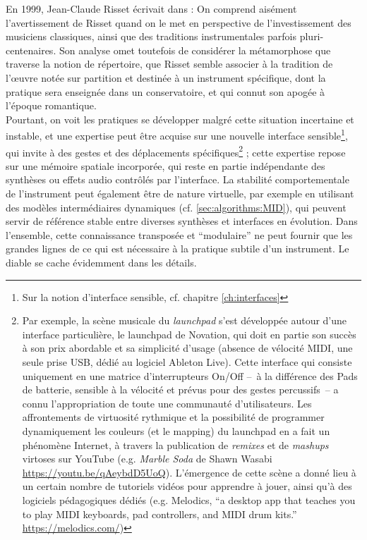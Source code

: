 \indent En 1999, Jean-Claude Risset écrivait dans \cite{genevois_les_1999} :  On comprend aisément l'avertissement de Risset quand on le met en perspective de l'investissement des musiciens classiques, ainsi que des traditions instrumentales parfois pluri-centenaires. Son analyse omet toutefois de considérer la métamorphose que traverse la notion de répertoire, que Risset semble associer à la tradition de l'œuvre notée sur partition et destinée à un instrument spécifique, dont la pratique sera enseignée dans un conservatoire, et qui connut son apogée à l'époque romantique.\\
\noindent Pourtant, on voit les pratiques se développer malgré cette situation incertaine et instable, et une expertise peut être acquise sur une nouvelle interface sensible\footnote{Sur la notion d'interface sensible, cf. chapitre \ref{ch:interfaces}}, qui invite à des gestes et des déplacements spécifiques\footnote{Par exemple, la scène musicale du \textit{launchpad} s'est développée autour d'une interface particulière, le launchpad de Novation, qui doit en partie son succès à son prix abordable et sa simplicité d'usage (absence de vélocité \gls{MIDI}, une seule prise \gls{USB}, dédié au logiciel Ableton Live). Cette interface qui consiste uniquement en une matrice d'interrupteurs On/Off --~à la différence des Pads de batterie, sensible à la vélocité et prévus pour des gestes percussifs~-- a connu l'appropriation de toute une communauté d'utilisateurs. Les affrontements de virtuosité rythmique et la possibilité de programmer dynamiquement les couleurs (et le mapping) du launchpad en a fait un phénomène Internet, à travers la publication de \textit{remixes} et de \textit{mashups} virtoses sur YouTube (e.g. \textit{Marble Soda} de Shawn Wasabi \url{https://youtu.be/qAeybdD5UoQ}). L'émergence de cette scène a donné lieu à un certain nombre de tutoriels vidéos pour apprendre à jouer, ainsi qu'à des logiciels pédagogiques dédiés (e.g. Melodics, ``a desktop app that teaches you to play MIDI keyboards, pad controllers, and MIDI drum kits.'' \url{https://melodics.com/})} ; cette expertise repose sur une mémoire spatiale incorporée, qui reste en partie indépendante des synthèses ou effets audio contrôlés par l'interface. La stabilité comportementale de l'instrument peut également être de nature virtuelle, par exemple en utilisant des modèles intermédiaires dynamiques \cite{goudard_dynamic_2011} (cf. \ref{sec:algorithms:MID}), qui peuvent servir de référence stable entre diverses synthèses et interfaces en évolution.
\noindent Dans l'ensemble, cette connaissance transposée et ``modulaire'' ne peut fournir que les grandes lignes de ce qui est nécessaire à la pratique subtile d'un instrument. Le diable se cache évidemment dans les détails.


